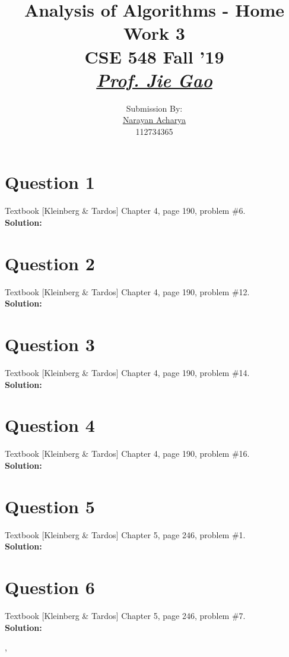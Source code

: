 \documentclass[11pt]{article}
\title{
	Analysis of Algorithms - Home Work 3\\[2mm]
	\large CSE 548 Fall '19\\[1mm]
	\href{mailto:jgao@cs.stonybrook.edu}{\textit{Prof. Jie Gao}}
}
\author{
	\small Submission By: \\
	\href{mailto:nacharya@cs.stonybrook.edu}{Narayan Acharya} \\
	\small 112734365
}
\date{\vspace{-5ex}}
\begin{document}
\maketitle
\thispagestyle{fancy} %

\tableofcontents

\clearpage

\section{Question 1} Textbook [Kleinberg \& Tardos] Chapter 4, page 190, problem \#6. \\
\textbf{Solution:} \\

   
\clearpage
\section{Question 2} Textbook [Kleinberg \& Tardos] Chapter 4, page 190, problem \#12. \\
\textbf{Solution:} \\


\clearpage
\section{Question 3} Textbook [Kleinberg \& Tardos] Chapter 4, page 190, problem \#14. \\
\textbf{Solution:} \\

\clearpage
\section{Question 4} Textbook [Kleinberg \& Tardos] Chapter 4, page 190, problem \#16. \\
\textbf{Solution:} \\

\clearpage
\section{Question 5} Textbook [Kleinberg \& Tardos] Chapter 5, page 246, problem \#1. \\
\textbf{Solution:} \\

\clearpage
\section{Question 6} Textbook [Kleinberg \& Tardos] Chapter 5, page 246, problem \#7. \\
\textbf{Solution:} \\

\clearpage

\begin{thebibliography}{9}
	\bibitem{} 
	,
	\\\texttt{}
	
\end{thebibliography}
\end{document}

